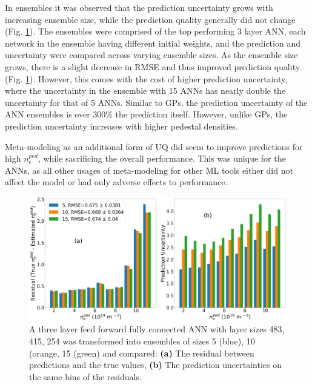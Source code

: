 \documentclass[a4paper, twoside, final, 12pt]{article}
\begin{document}
{In ensembles it was observed that the prediction uncertainty grows with increasing ensemble size, while the prediction quality generally did not change (Fig. \ref{fig:ANN_UQ}). The ensembles were comprised of the top performing 3 layer ANN, each network in the ensemble having different initial weights, and the prediction and uncertainty were compared across varying ensemble sizes. As the ensemble size grows, there is a slight decrease in RMSE and thus improved prediction quality (Fig. \ref{fig:ANN_UQ}). However, this comes with the cost of higher prediction uncertainty, where the uncertainty in the ensemble with 15 ANNs has nearly double the uncertainty for that of 5 ANNs. Similar to GPs, the prediction uncertainty of the ANN ensembles is over 300\% the prediction itself. However, unlike GPs, the prediction uncertainty increases with higher pedestal densities. 

Meta-modeling as an additional form of UQ did seem to improve predictions for high $n_e^{ped}$, while sacrificing the overall performance.
This was unique for the ANNs, as all other usages of meta-modeling for other ML tools either did not affect the model or had only adverse effects to performance.

\begin{figure}[h!]
	\centering
	\includegraphics[scale=0.2]{./src/ANN_comp}
	\caption{A three layer feed forward fully connected ANN with layer sizes 483, 415, 254 was transformed into ensembles of sizes 5 (blue), 10 (orange, 15 (green) and compared: \textbf{(a)} The residual between predictions and the true values, \textbf{(b)} The prediction uncertainties on the same bins of the residuals. }
	\label{fig:ANN_UQ}
\end{figure}

}
\end{document}
